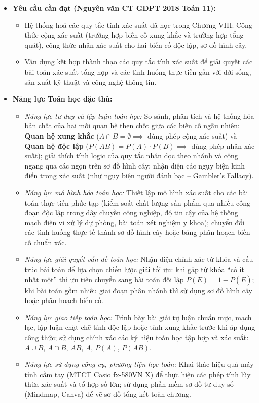 \documentclass[12pt, a4paper]{article}
\begin{document}
\begin{itemize}[leftmargin=1.2cm]
    \item \textbf{Yêu cầu cần đạt (Nguyên văn CT GDPT 2018 Toán 11):}
    \begin{itemize}[leftmargin=0.6cm]
        \item Hệ thống hoá các quy tắc tính xác suất đã học trong Chương VIII: Công thức cộng xác suất (trường hợp biến cố xung khắc và trường hợp tổng quát), công thức nhân xác suất cho hai biến cố độc lập, sơ đồ hình cây.
        \item Vận dụng kết hợp thành thạo các quy tắc tính xác suất để giải quyết các bài toán xác suất tổng hợp và các tình huống thực tiễn gắn với đời sống, sản xuất kỹ thuật và công nghệ thông tin.
    \end{itemize}

    \item \textbf{Năng lực Toán học đặc thù:}
    \begin{itemize}[leftmargin=0.6cm]
        \item \textit{Năng lực tư duy và lập luận toán học:} So sánh, phân tích và hệ thống hóa bản chất của hai mối quan hệ then chốt giữa các biến cố ngẫu nhiên: \textbf{Quan hệ xung khắc} ($A \cap B = \emptyset \implies$ dùng phép cộng xác suất) và \textbf{Quan hệ độc lập} ($P(AB) = P(A) \cdot P(B) \implies$ dùng phép nhân xác suất); giải thích tính logic của quy tắc nhân dọc theo nhánh và cộng ngang qua các ngọn trên sơ đồ hình cây; nhận diện các ngụy biện kinh điển trong xác suất (như ngụy biện người đánh bạc -- Gambler's Fallacy).
        \item \textit{Năng lực mô hình hóa toán học:} Thiết lập mô hình xác suất cho các bài toán thực tiễn phức tạp (kiểm soát chất lượng sản phẩm qua nhiều công đoạn độc lập trong dây chuyền công nghiệp, độ tin cậy của hệ thống mạch điện vi xử lý dự phòng, bài toán xét nghiệm y khoa); chuyển đổi các tình huống thực tế thành sơ đồ hình cây hoặc bảng phân hoạch biến cố chuẩn xác.
        \item \textit{Năng lực giải quyết vấn đề toán học:} Nhận diện chính xác từ khóa và cấu trúc bài toán để lựa chọn chiến lược giải tối ưu: khi gặp từ khóa ``có ít nhất một'' thì ưu tiên chuyển sang bài toán đối lập $P(E) = 1 - P(\overline{E})$; khi bài toán gồm nhiều giai đoạn phân nhánh thì sử dụng sơ đồ hình cây hoặc phân hoạch biến cố.
        \item \textit{Năng lực giao tiếp toán học:} Trình bày bài giải tự luận chuẩn mực, mạch lạc, lập luận chặt chẽ tính độc lập hoặc tính xung khắc trước khi áp dụng công thức; sử dụng chính xác các ký hiệu toán học tập hợp và xác suất: $A \cup B$, $A \cap B$, $AB$, $\overline{A}$, $P(A)$, $P(AB)$.
        \item \textit{Năng lực sử dụng công cụ, phương tiện học toán:} Khai thác hiệu quả máy tính cầm tay (MTCT Casio fx-580VN X) để thực hiện các phép tính lũy thừa xác suất và tổ hợp số lớn; sử dụng phần mềm sơ đồ tư duy số (Mindmap, Canva) để vẽ sơ đồ tổng kết toàn chương.
    \end{itemize}


\end{itemize}
\end{document}
